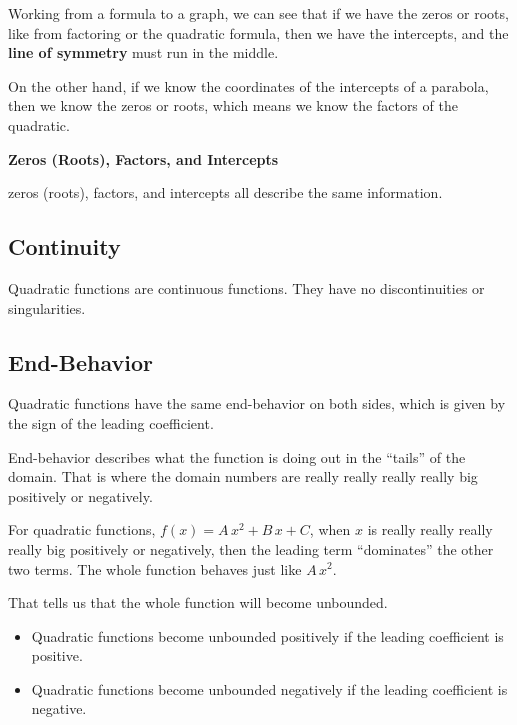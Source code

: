 \documentclass{ximera}
\begin{document}
Working from a formula to a graph, we can see that if we have the zeros or roots, like from factoring or the quadratic formula, then we have the intercepts, and the \textbf{line of symmetry} must run in the middle. 


On the other hand, if we know the coordinates of the intercepts of a parabola, then we know the zeros or roots, which means we know the factors of the quadratic.




\begin{idea} \textbf{\textcolor{blue!55!black}{Zeros (Roots), Factors, and Intercepts}} 


zeros (roots), factors, and intercepts all describe the same information.


\end{idea}






\subsection*{Continuity}

Quadratic functions are continuous functions.  They have no discontinuities or singularities. 












\subsection*{End-Behavior}

Quadratic functions have the same end-behavior on both sides, which is given by the sign of the leading coefficient. 


End-behavior describes what the function is doing out in the ``tails'' of the domain.  That is where the domain numbers are really really really really big positively or negatively. 

For quadratic functions, $f(x) = A \, x^2 + B \, x + C$, when $x$ is really really really really big positively or negatively, then the leading term ``dominates'' the other two terms.  The whole function behaves just like $A \, x^2$. 

That tells us that the whole function will become unbounded. 


\begin{itemize}
     \item Quadratic functions become unbounded positively if the leading coefficient is positive.
     \item Quadratic functions become unbounded negatively if the leading coefficient is negative.
\end{itemize}
\end{document}
